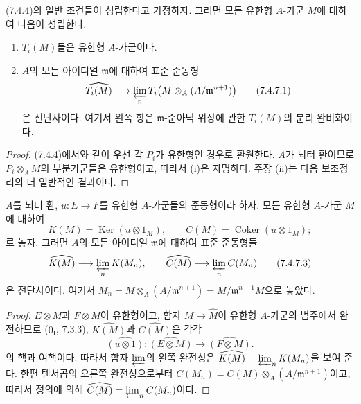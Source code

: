 \begin{proposition}[7.4.7]
\label{III.7.4.7-fr}
(\hyperref[III.7.4.4-fr]{7.4.4})의 일반 조건들이 성립한다고 가정하자.
그러면 모든 유한형 $A$-가군 $M$에 대하여 다음이 성립한다.
\begin{enumerate}
  \item[(i)] $T_i(M)$들은 유한형 $A$-가군이다.
  \item[(ii)] $A$의 모든 아이디얼 $\mathfrak m$에 대하여 표준 준동형
    \[
      \widehat{T_i(M)}
      \longrightarrow
      \varprojlim_n T_i\bigl(M\otimes_A(A/\mathfrak m^{n+1})\bigr)
      \tag{7.4.7.1}\label{III.7.4.7.1.fr}
    \]
    은 전단사이다. 여기서 왼쪽 항은 $\mathfrak m$-준아딕 위상에
    관한 $T_i(M)$의 분리 완비화이다.
\end{enumerate}
\end{proposition}

\begin{proof}
(\hyperref[III.7.4.4-fr]{7.4.4})에서와 같이 우선 각 $P_i$가 유한형인
경우로 환원한다. $A$가 뇌터 환이므로 $P_i\otimes_A M$의 부분가군들은
유한형이고, 따라서 (i)은 자명하다. 주장 (ii)는 다음 보조정리의 더
일반적인 결과이다.
\end{proof}

\begin{lemma}[7.4.7.2]
\label{III.7.4.7.2-fr}
$A$를 뇌터 환, $u:E\to F$를 유한형 $A$-가군들의 준동형이라 하자.
모든 유한형 $A$-가군 $M$에 대하여
\[
  K(M)=\operatorname{Ker}(u\otimes1_M),
  \qquad
  C(M)=\operatorname{Coker}(u\otimes1_M);
\]
로 놓자. 그러면 $A$의 모든 아이디얼 $\mathfrak m$에 대하여 표준
준동형들
\[
  \widehat{K(M)}\longrightarrow\varprojlim_n K(M_n),
  \qquad
  \widehat{C(M)}\longrightarrow\varprojlim_n C(M_n)
  \tag{7.4.7.3}\label{III.7.4.7.3.fr}
\]
은 전단사이다. 여기서
$M_n=M\otimes_A(A/\mathfrak m^{n+1})=M/\mathfrak m^{n+1}M$으로
놓았다.
\end{lemma}

\begin{proof}
$E\otimes M$과 $F\otimes M$이 유한형이고, 함자
$M\mapsto\widehat M$이 유한형 $A$-가군의 범주에서 완전하므로
($0_{\mathrm I}$, 7.3.3), $\widehat{K(M)}$과 $\widehat{C(M)}$은 각각
\[
  \widehat{(u\otimes1)}:
  \widehat{(E\otimes M)}\longrightarrow\widehat{(F\otimes M)}.
\]
의 핵과 여핵이다. 따라서 함자 $\varprojlim$의 왼쪽 완전성은
$\widehat{K(M)}=\varprojlim_n K(M_n)$을 보여 준다. 한편 텐서곱의
오른쪽 완전성으로부터
$C(M_n)=C(M)\otimes_A(A/\mathfrak m^{n+1})$이고, 따라서 정의에 의해
$\widehat{C(M)}=\varprojlim_n C(M_n)$이다.
\end{proof}

